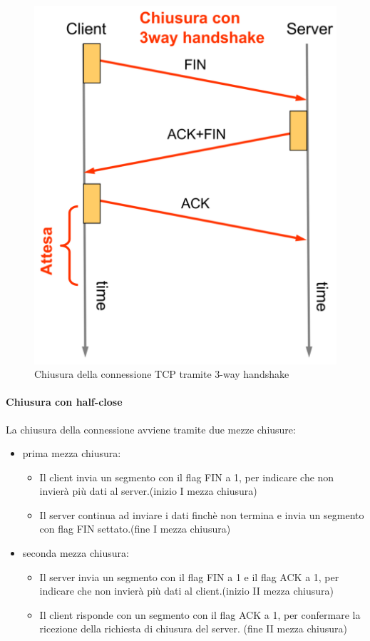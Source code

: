 \begin{figure}[h!]
\begin{minipage}{0.48\textwidth}
        \includegraphics[width=\textwidth]{images/3wayclose.png}
        \caption{Chiusura della connessione TCP tramite 3-way handshake}
        \label{fig:3wayclose}
    \end{minipage}
\end{figure}

\paragraph{Chiusura con half-close}
La chiusura della connessione avviene tramite due mezze chiusure:
\begin{itemize}
    \item prima mezza chiusura:
    \begin{itemize}
            \item Il client invia un segmento con il flag FIN a 1, per indicare che non invierà più dati al server.(inizio I mezza chiusura) 
            \item Il server continua ad inviare i dati finchè non termina e invia un segmento con flag FIN settato.(fine I mezza chiusura)
    \end{itemize}
    \item seconda mezza chiusura:
    \begin{itemize}
            \item Il server invia un segmento con il flag FIN a 1 e il flag ACK a 1, per indicare che non invierà più dati al client.(inizio II mezza chiusura) 
            \item Il client risponde con un segmento con il flag ACK a 1, per confermare la ricezione della richiesta di chiusura del server. (fine II mezza chiusura)
    \end{itemize}
\end{itemize} 



